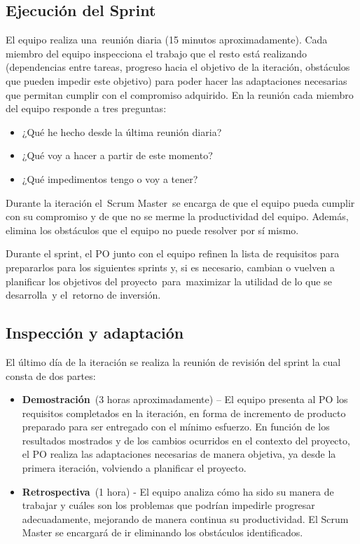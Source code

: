 \subsection{Ejecución del Sprint}
El equipo realiza una reunión diaria (15 minutos aproximadamente). Cada miembro del equipo inspecciona el trabajo que el resto está realizando (dependencias entre tareas, progreso hacia el objetivo de la iteración, obstáculos que pueden impedir este objetivo) para poder hacer las adaptaciones necesarias que permitan cumplir con el compromiso adquirido. En la reunión cada miembro del equipo responde a tres preguntas:
\begin{itemize}
    \item ¿Qué he hecho desde la última reunión diaria?
    \item ¿Qué voy a hacer a partir de este momento?
    \item ¿Qué impedimentos tengo o voy a tener?
\end{itemize}
Durante la iteración el Scrum Master se encarga de que el equipo pueda cumplir con su compromiso y de que no se merme la productividad del equipo. Además, elimina los obstáculos que el equipo no puede resolver por sí mismo.

Durante el sprint, el PO junto con el equipo refinen la lista de requisitos para prepararlos para los siguientes sprints y, si es necesario, cambian o vuelven a planificar los objetivos del proyecto para maximizar la utilidad de lo que se desarrolla y el retorno de inversión.

\subsection{Inspección y adaptación}
El último día de la iteración se realiza la reunión de revisión del sprint la cual consta de dos partes:
\begin{itemize}
    \item \textbf{Demostración} (3 horas aproximadamente) – El equipo presenta al PO los requisitos completados en la iteración, en forma de incremento de producto preparado para ser entregado con el mínimo esfuerzo. En función de los resultados mostrados y de los cambios ocurridos en el contexto del proyecto, el PO realiza las adaptaciones necesarias de manera objetiva, ya desde la primera iteración, volviendo a planificar el proyecto.
    \item \textbf{Retrospectiva} (1 hora) - El equipo analiza cómo ha sido su manera de trabajar y cuáles son los problemas que podrían impedirle progresar adecuadamente, mejorando de manera continua su productividad. El Scrum Master se encargará de ir eliminando los obstáculos identificados.
\end{itemize}